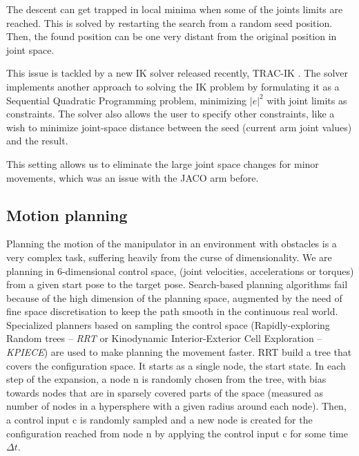 \documentclass[buriama8_dp.tex]{subfiles}
\begin{document}
The descent can get trapped in local minima when some of the joints limits are reached. This is solved by restarting the search from a random seed position. Then, the found position can be one very distant from the original position in joint space.

This issue is tackled by a new IK solver released recently, TRAC-IK \cite{tracik}. The solver implements another approach to solving the IK problem by formulating it as a Sequential Quadratic Programming problem, minimizing \(|e|^2\) with joint limits as constraints. The solver also allows the user to specify other constraints, like a wish to minimize joint-space distance between the seed (current arm joint values) and the result.

This setting allows us to eliminate the large joint space changes for minor movements, which was an issue with the JACO arm before. 

\subsection{Motion planning}
\label{subsec:moveit_motion_planning}

Planning the motion of the manipulator in an environment with obstacles is a very complex task, suffering heavily from the curse of dimensionality. We are planning in 6-dimensional control space, (joint velocities, accelerations or torques) from a given start pose to the target pose. Search-based planning algorithms fail because of the high dimension of the planning space, augmented by the need of fine space discretisation to keep the path smooth in the continuous real world. Specialized planners based on sampling the control space (Rapidly-exploring Random trees -- \emph{RRT} or Kinodynamic Interior-Exterior Cell Exploration -- \emph{KPIECE})  are used to make planning the movement faster.
RRT build a tree that covers the configuration space. It starts as a single node, the start state. In each step of the expansion, a node \m n is randomly chosen from the tree, with bias towards nodes that are in sparsely covered parts of the space (measured as number of nodes in a hypersphere with a given radius around each node). Then, a control input \m c is randomly sampled and a new node is created for the configuration reached from node \m n by applying the control input \m c for some time \(\Delta t\).


\end{document}
